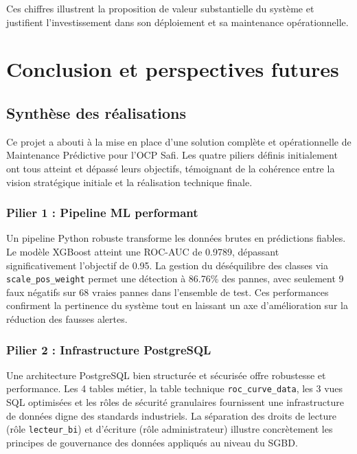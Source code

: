 \documentclass[a4paper,12pt]{report}
\begin{document}
Ces chiffres illustrent la proposition de valeur substantielle du système et justifient l'investissement dans son déploiement et sa maintenance opérationnelle.


\chapter{Conclusion et perspectives futures}

\section{Synthèse des réalisations}

Ce projet a abouti à la mise en place d'une solution complète et opérationnelle de Maintenance Prédictive pour l'OCP Safi. Les quatre piliers définis initialement ont tous atteint et dépassé leurs objectifs, témoignant de la cohérence entre la vision stratégique initiale et la réalisation technique finale.

\subsection{Pilier 1 : Pipeline ML performant}

Un pipeline Python robuste transforme les données brutes en prédictions fiables. Le modèle XGBoost atteint une ROC-AUC de 0.9789, dépassant significativement l'objectif de 0.95. La gestion du déséquilibre des classes via \texttt{scale\_pos\_weight} permet une détection à 86.76\% des pannes, avec seulement 9 faux négatifs sur 68 vraies pannes dans l'ensemble de test. Ces performances confirment la pertinence du système tout en laissant un axe d'amélioration sur la réduction des fausses alertes.

\subsection{Pilier 2 : Infrastructure PostgreSQL}

Une architecture PostgreSQL bien structurée et sécurisée offre robustesse et performance. Les 4 tables métier, la table technique \texttt{roc\_curve\_data}, les 3 vues SQL optimisées et les rôles de sécurité granulaires fournissent une infrastructure de données digne des standards industriels. La séparation des droits de lecture (rôle \texttt{lecteur\_bi}) et d'écriture (rôle administrateur) illustre concrètement les principes de gouvernance des données appliqués au niveau du SGBD.
\end{document}
